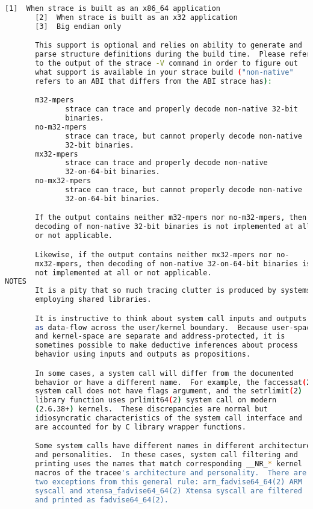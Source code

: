 {{\begin{lstlisting}[language=bash]
       [1]  When strace is built as an x86_64 application
       [2]  When strace is built as an x32 application
       [3]  Big endian only

       This support is optional and relies on ability to generate and
       parse structure definitions during the build time.  Please refer
       to the output of the strace -V command in order to figure out
       what support is available in your strace build ("non-native"
       refers to an ABI that differs from the ABI strace has):

       m32-mpers
              strace can trace and properly decode non-native 32-bit
              binaries.
       no-m32-mpers
              strace can trace, but cannot properly decode non-native
              32-bit binaries.
       mx32-mpers
              strace can trace and properly decode non-native
              32-on-64-bit binaries.
       no-mx32-mpers
              strace can trace, but cannot properly decode non-native
              32-on-64-bit binaries.

       If the output contains neither m32-mpers nor no-m32-mpers, then
       decoding of non-native 32-bit binaries is not implemented at all
       or not applicable.

       Likewise, if the output contains neither mx32-mpers nor no-
       mx32-mpers, then decoding of non-native 32-on-64-bit binaries is
       not implemented at all or not applicable.
NOTES
       It is a pity that so much tracing clutter is produced by systems
       employing shared libraries.

       It is instructive to think about system call inputs and outputs
       as data-flow across the user/kernel boundary.  Because user-space
       and kernel-space are separate and address-protected, it is
       sometimes possible to make deductive inferences about process
       behavior using inputs and outputs as propositions.

       In some cases, a system call will differ from the documented
       behavior or have a different name.  For example, the faccessat(2)
       system call does not have flags argument, and the setrlimit(2)
       library function uses prlimit64(2) system call on modern
       (2.6.38+) kernels.  These discrepancies are normal but
       idiosyncratic characteristics of the system call interface and
       are accounted for by C library wrapper functions.

       Some system calls have different names in different architectures
       and personalities.  In these cases, system call filtering and
       printing uses the names that match corresponding __NR_* kernel
       macros of the tracee's architecture and personality.  There are
       two exceptions from this general rule: arm_fadvise64_64(2) ARM
       syscall and xtensa_fadvise64_64(2) Xtensa syscall are filtered
       and printed as fadvise64_64(2).


\end{lstlisting}}}
